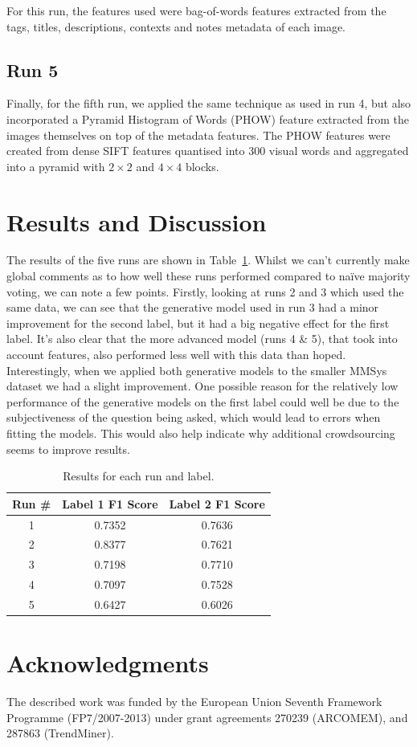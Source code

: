 \documentclass{../acm_proc_article-me11_tweaked}
\begin{document}
For this run, the features used were bag-of-words features extracted from the tags, titles, descriptions, contexts and notes metadata of each image.

\subsection{Run 5}
Finally, for the fifth run, we applied the same technique as used in run 4, but also incorporated a Pyramid Histogram of Words (PHOW) feature extracted from the images themselves on top of the metadata features. The PHOW features were created from dense SIFT features quantised into 300 visual words and aggregated into a pyramid with $2{\times}2$ and $4{\times}4$ blocks.

\section{Results and Discussion}
The results of the five runs are shown in Table~\ref{tab:results}. Whilst we can't currently make global comments as to how well these runs performed compared to na\"ive majority voting, we can note a few points. Firstly, looking at runs 2 and 3 which used the same data, we can see that the generative model used in run 3 had a minor improvement for the second label, but it had a big negative effect for the first label. It's also clear that the more advanced model (runs 4 \& 5), that took into account features, also performed less well with this data than hoped. Interestingly, when we applied both generative models to the smaller MMSys dataset we had a slight improvement. One possible reason for the relatively low performance of the generative models on the first label could well be due to the subjectiveness of the question being asked, which would lead to errors when fitting the models. This would also help indicate why additional crowdsourcing seems to improve results.

\begin{table}
	\centering
	\caption{\label{tab:results}Results for each run and label.}
	\begin{tabular}{|c|c|c|}
		\hline
		Run \# & Label 1 F1 Score & Label 2 F1 Score \\ \hline \hline
		1 & 0.7352 & 0.7636 \\ \hline
		2 & 0.8377 & 0.7621 \\ \hline
		3 & 0.7198 & 0.7710 \\ \hline
		4 & 0.7097 & 0.7528 \\ \hline
		5 & 0.6427 & 0.6026 \\ \hline
	\end{tabular}
\end{table}

\section{Acknowledgments}
The described work was funded by the European Union Seventh Framework Programme (FP7/2007-2013) under grant agreements 270239 (ARCOMEM), and 287863 (TrendMiner).



\end{document}
